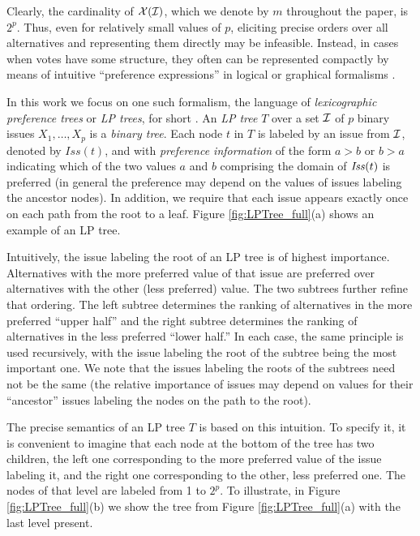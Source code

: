 Clearly, the cardinality of $\mathcal{X}(\mathcal{I})$, which we denote by $m$ throughout 
the paper, is $2^p$. Thus, even for relatively small values of $p$, 
eliciting precise orders over all alternatives and representing them 
directly may be infeasible. Instead, in cases when votes have some 
structure, they often can be represented compactly by means of
intuitive ``preference expressions'' in logical or graphical
formalisms \cite{bbdh03,lang:aggLP,Kaci:Pref}. 

In this work we focus on one such formalism, the language of 
\emph{lexicographic preference trees} or \emph{LP trees}, for short
\cite{booth:learningLP}. 
An \emph{LP tree} $T$ over a set $\mathcal{I}$ 
of $p$ binary issues $X_1,\ldots,X_p$ is a \emph{binary tree}. Each
node $t$ in $T$ is labeled by an issue from $\mathcal{I}$, denoted by 
$\mathit{Iss}(t)$, and with \emph{preference information} of the form
$a>b$ or $b>a$ indicating which of the two values $a$ and $b$  comprising
the domain of $\mathit{Iss}(t)$ is preferred (in general the preference may depend
on the values of issues labeling the ancestor nodes). In addition, we
require that each issue appears exactly once on each path from the root 
to a leaf. Figure \ref{fig:LPTree_full}(a) shows an example of an LP tree. 

Intuitively, the issue labeling the root of an LP tree is of highest 
importance. Alternatives with the more preferred value of that issue
are preferred over alternatives with the other (less preferred) value.
The two subtrees further refine that ordering. The left subtree determines 
the ranking of alternatives in the more preferred ``upper half'' and the 
right subtree determines the ranking of alternatives in the less 
preferred ``lower half.'' In each case, the same principle is used 
recursively, with the issue labeling the root of the subtree being 
the most important one. We note that the issues labeling the roots of 
the subtrees need not be the same (the relative importance of issues may 
depend on values for their ``ancestor'' issues labeling the nodes on the 
path to the root).

The precise semantics of an LP tree $T$ is based on this intuition. 
To specify it, it is convenient to imagine that each node at the bottom 
of the tree has two children, the left one corresponding to the more 
preferred value of the issue labeling it, and the right one corresponding 
to the other, less preferred one. The nodes of that level are labeled
from 1 to $2^p$. To illustrate, in Figure \ref{fig:LPTree_full}(b) we 
show the tree from Figure \ref{fig:LPTree_full}(a) with the last level 
present. 


